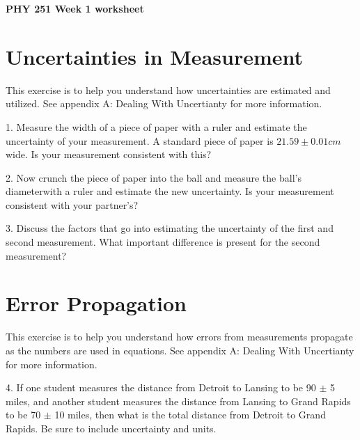 \documentclass{article}
\begin{document}
\pagestyle{empty}


\begin{center}
\bf PHY 251 Week 1 worksheet
\end{center}

\section*{\normalsize Uncertainties in Measurement}

This exercise is to help you understand how uncertainties are estimated and utilized. See appendix A: Dealing With Uncertianty for more information. 

\vspace*{0.25cm}

1. Measure the width of a piece of paper with a ruler and estimate the uncertainty of your measurement.  A standard piece of paper is $21.59 \pm 0.01 cm$ wide. Is your measurement consistent with this?

\vspace*{1cm}

2. Now crunch the piece of paper into the ball and measure the ball's diameterwith a ruler and estimate the new uncertainty. Is your measurement consistent with your partner's?

\vspace*{1cm}

3. Discuss the factors that go into estimating the uncertainty of the first and second measurement. What important difference is present for the second measurement?

\vspace*{5mm}

\section*{\normalsize Error Propagation}

This exercise is to help you understand how errors from measurements propagate as the numbers are used in equations. See appendix A: Dealing With Uncertianty for more information. 

\vspace*{0.25cm}

4. If one student measures the distance from Detroit to Lansing to be 90 $\pm$ 5 miles, and another student measures the distance from Lansing to Grand Rapids to be 70 $\pm$ 10 miles, then what is the total distance from Detroit to Grand Rapids. Be sure to include uncertainty and units.
\end{document}
